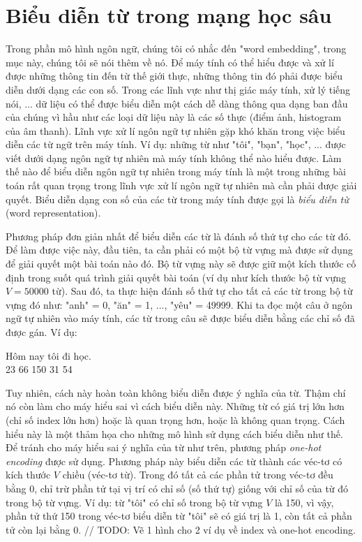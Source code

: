 \section{Biểu diễn từ trong mạng học sâu} \label{wordembeddingsection}
Trong phần mô hình ngôn ngữ, chúng tôi có nhắc đến "word embedding", trong mục này, chúng tôi sẽ nói thêm về nó. Để máy tính có thể hiểu được và xử lí được những thông tin đến từ thế giới thực, những thông tin đó phải được biểu diễn dưới dạng các con số. Trong các lĩnh vực như thị giác máy tính, xử lý tiếng nói, ... dữ liệu có thể được biểu diễn một cách dễ dàng thông qua dạng ban đầu của chúng vì hầu như các loại dữ liệu này là các số thực (điểm ảnh, histogram của âm thanh). Lĩnh vực xử lí ngôn ngữ tự nhiên gặp khó khăn trong việc biểu diễn các từ ngữ trên máy tính. Ví dụ: những từ như "tôi", "bạn", "học", ... được viết dưới dạng ngôn ngữ tự nhiên mà máy tính không thể nào hiểu được. Làm thế nào để biểu diễn ngôn ngữ tự nhiên trong máy tính là một trong những bài toán rất quan trọng trong lĩnh vực xử lí ngôn ngữ tự nhiên mà cần phải được giải quyết. Biểu diễn dạng con số của các từ trong máy tính được gọi là \textit{biểu diễn từ} (word representation).

Phương pháp đơn giản nhất để biểu diễn các từ là đánh số thứ tự cho các từ đó. Để làm được việc này, đầu tiên, ta cần phải có một bộ từ vựng mà được sử dụng để giải quyết một bài toán nào đó. Bộ từ vựng này sẽ được giữ một kích thước cố định trong suốt quá trình giải quyết bài toán (ví dụ như kích thước bộ từ vựng $V = 50000$ từ). Sau đó, ta thực hiện đánh số thứ tự cho tất cả các từ trong bộ từ vựng đó như: "anh" = 0, "ăn" = 1, ..., "yêu" = 49999. Khi ta đọc một câu ở ngôn ngữ tự nhiên vào máy tính, các từ trong câu sẽ được biểu diễn bằng các chỉ số đã được gán. Ví dụ:
\begin{center}
	Hôm nay tôi đi học. \\
	23  66  150 31 54
\end{center}

Tuy nhiên, cách này hoàn toàn không biểu diễn được ý nghĩa của từ. Thậm chí nó còn làm cho máy hiểu sai vì cách biểu diễn này. Những từ có giá trị lớn hơn (chỉ số index lớn hơn) hoặc là quan trọng hơn, hoặc là không quan trọng. Cách hiểu này là một thảm họa cho những mô hình sử dụng cách biểu diễn như thế. Để tránh cho máy hiểu sai ý nghĩa của từ như trên, phương pháp \textit{one-hot encoding} được sử dụng. Phương pháp này biểu diễn các từ thành các véc-tơ có kích thước $V$ chiều (véc-tơ từ). Trong đó tất cả các phần tử trong véc-tơ đều bằng 0, chỉ trừ phần tử tại vị trí có chỉ số (số thứ tự) giống với chỉ số của từ đó trong bộ từ vựng. Ví dụ: từ "tôi" có chỉ số trong bộ từ vựng $V$ là 150, vì vậy, phần tử thứ 150 trong véc-tơ biểu diễn từ "tôi" sẽ có giá trị là 1, còn tất cả phần tử còn lại bằng 0.
// TODO: Vẽ 1 hình cho 2 ví dụ về index và one-hot encoding.

